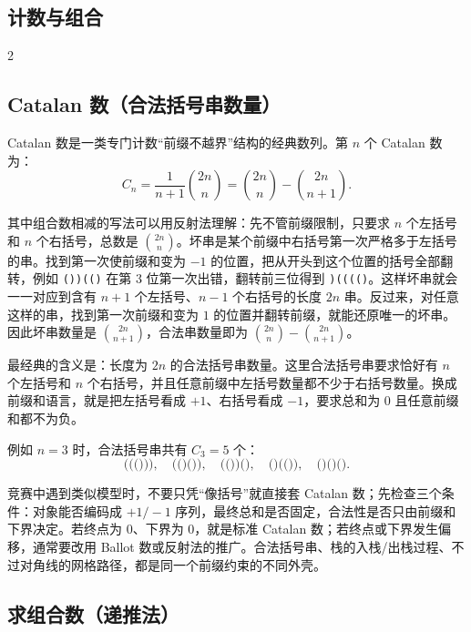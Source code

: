 	\begin{center}
		\section{计数与组合}
	\end{center}

	\begin{multicols*}{2}

		\subsection{Catalan 数（合法括号串数量）}

		Catalan 数是一类专门计数“前缀不越界”结构的经典数列。第 $n$ 个 Catalan 数为：
		\[
			C_n = \frac{1}{n + 1}\binom{2n}{n}
			= \binom{2n}{n} - \binom{2n}{n + 1}.
		\]

		其中组合数相减的写法可以用反射法理解：先不管前缀限制，只要求 $n$ 个左括号和 $n$ 个右括号，总数是 $\binom{2n}{n}$。坏串是某个前缀中右括号第一次严格多于左括号的串。找到第一次使前缀和变为 $-1$ 的位置，把从开头到这个位置的括号全部翻转，例如 \texttt{())(()} 在第 $3$ 位第一次出错，翻转前三位得到 \texttt{)(((()}。这样坏串就会一一对应到含有 $n + 1$ 个左括号、$n - 1$ 个右括号的长度 $2n$ 串。反过来，对任意这样的串，找到第一次前缀和变为 $1$ 的位置并翻转前缀，就能还原唯一的坏串。因此坏串数量是 $\binom{2n}{n + 1}$，合法串数量即为 $\binom{2n}{n} - \binom{2n}{n + 1}$。

		最经典的含义是：长度为 $2n$ 的合法括号串数量。这里合法括号串要求恰好有 $n$ 个左括号和 $n$ 个右括号，并且任意前缀中左括号数量都不少于右括号数量。换成前缀和语言，就是把左括号看成 $+1$、右括号看成 $-1$，要求总和为 $0$ 且任意前缀和都不为负。

		例如 $n = 3$ 时，合法括号串共有 $C_3 = 5$ 个：
		\[
			\texttt{((()))},\quad
			\texttt{(()())},\quad
			\texttt{(())()},\quad
			\texttt{()(())},\quad
			\texttt{()()()}.
		\]

		竞赛中遇到类似模型时，不要只凭“像括号”就直接套 Catalan 数；先检查三个条件：对象能否编码成 $+1/-1$ 序列，最终总和是否固定，合法性是否只由前缀和下界决定。若终点为 $0$、下界为 $0$，就是标准 Catalan 数；若终点或下界发生偏移，通常要改用 Ballot 数或反射法的推广。合法括号串、栈的入栈/出栈过程、不过对角线的网格路径，都是同一个前缀约束的不同外壳。

		\subsection{求组合数（递推法）}


\end{multicols*}
